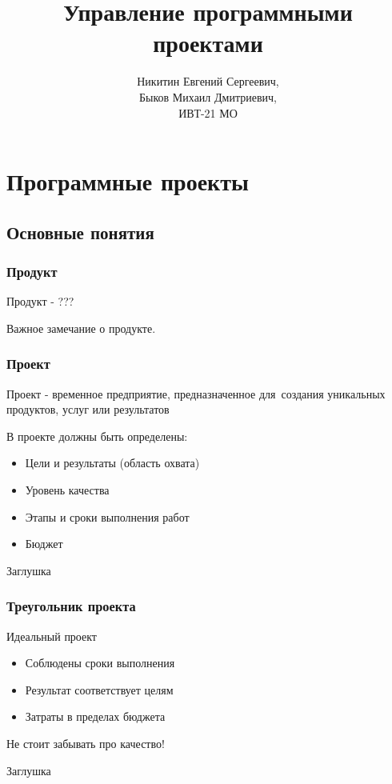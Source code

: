 \documentclass{../industrial-development}
\title{Управление программными проектами}
\author{Никитин Евгений Сергеевич,\\Быков Михаил Дмитриевич,\\ИВТ-21 МО}
\date{}
\begin{document}
    
    \begin{frame}
      \titlepage
    \end{frame}

    \section{Программные проекты}

    \subsection{Основные понятия}

    \begin{frame} \frametitle{Продукт}
        \begin{definition}
            Продукт - ???
        \end{definition}
        \medskip
        Важное замечание о продукте.
    \end{frame}

    \begin{frame} \frametitle{Проект}
        \begin{definition}
            Проект - временное предприятие, предназначенное для~создания уникальных продуктов, услуг или результатов
        \end{definition}
        \medskip
        В проекте должны быть определены:
        \begin{itemize}
            \item Цели и результаты (область охвата)
            \item Уровень качества
            \item Этапы и сроки выполнения работ
            \item Бюджет
        \end{itemize}
    \end{frame}
    \lecturenotes
    Заглушка
    
    \begin{frame} \frametitle{Треугольник проекта}
        \begin{block}{Идеальный проект}
            \begin{itemize}
                \item Соблюдены сроки выполнения
                \item Результат соответствует целям
                \item Затраты в пределах бюджета
            \end{itemize}
        \end{block}
        \medskip
        Не стоит забывать про \alert{качество}!
    \end{frame}
    \lecturenotes
    Заглушка
\end{document}

